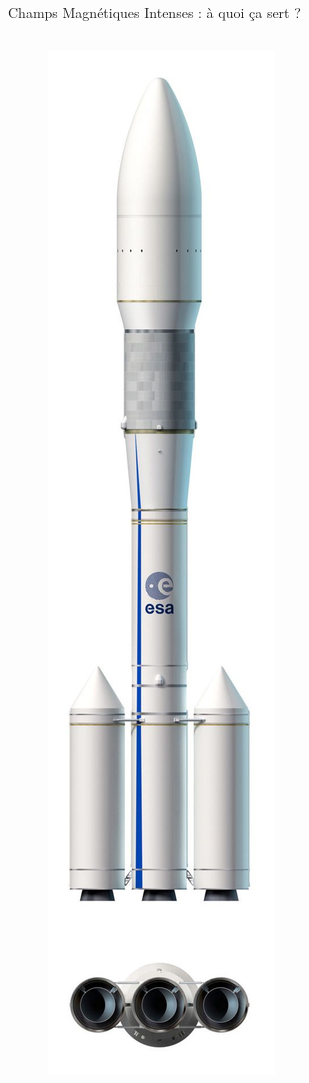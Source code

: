 \begin{frame}{Champs Magnétiques Intenses : à quoi ça sert ?}
\begin{columns}[c]
\begin{column}{0.25\textwidth}
\begin{figure}[H]
          \includegraphics[scale=0.12]{Figures/cmi/ariane6_2.jpg}
        \end{figure}
      \end{column}
    \end{columns}
\end{frame}

